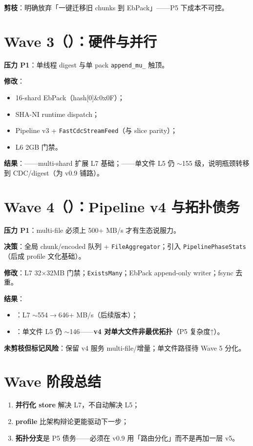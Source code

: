 \textbf{剪枝}：明确放弃「一键迁移旧 chunks 到 EbPack」——P5 下成本不可控。

\section{Wave 3（）：硬件与并行}

\textbf{压力 P1}：单线程 digest 与单 pack \texttt{append\_mu\_} 触顶。

\textbf{修改}：
\begin{itemize}[nosep]
  \item 16-shard EbPack（hash[0]\&0x0F）；
  \item SHA-NI runtime dispatch；
  \item Pipeline v3 + \texttt{FastCdcStreamFeed}（与 slice parity）；
  \item L6 2GB 门禁。
\end{itemize}

\textbf{结果}：——multi-shard 扩展 L7 基础；——单文件 L5 仍 $\sim$155 级，说明瓶颈转移到 CDC/digest（为 v0.9 铺路）。

\section{Wave 4（）：Pipeline v4 与拓扑债务}

\textbf{压力 P1}：multi-file 必须上 500+ MB/s 才有生态说服力。

\textbf{决策}：全局 chunk/encoded 队列 + \texttt{FileAggregator}；引入 \texttt{PipelinePhaseStats}（后成 profile 文化基础）。

\textbf{修改}：L7 32$\times$32MB 门禁；\texttt{ExistsMany}；EbPack append-only writer；fsync 去重。

\textbf{结果}：
\begin{itemize}[nosep]
  \item {}：L7 $\sim$554$\rightarrow$646+ MB/s（后续版本）；
  \item {}：单文件 L5 仍 $\sim$146——\textbf{v4 对单大文件非最优拓扑}（P5 复杂度↑）。
\end{itemize}

\textbf{未剪枝但标记风险}：保留 v4 服务 multi-file/增量；单文件路径待 Wave 5 分化。

\section{Wave 阶段总结}

\begin{philobox}
\begin{enumerate}[nosep]
  \item \textbf{并行化 store} 解决 L7，不自动解决 L5；
  \item \textbf{profile} 比架构辩论更能驱动下一步；
  \item \textbf{拓扑分支}是 P5 债务——必须在 v0.9 用「路由分化」而不是再加一层 v5。
\end{enumerate}
\end{philobox}
